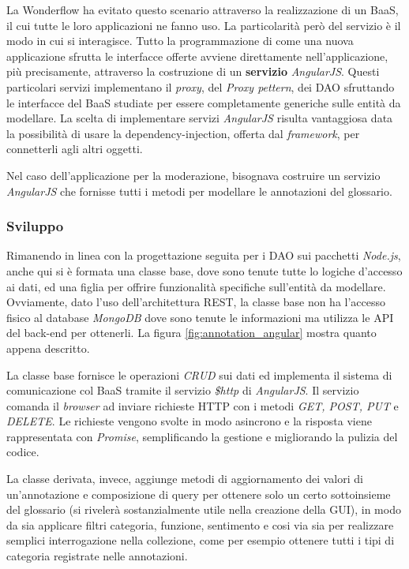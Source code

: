 La Wonderflow ha evitato questo scenario attraverso la realizzazione di un
\gls{BaaS}, il cui tutte le loro applicazioni ne fanno uso. La particolarità
però del servizio è il modo in cui si interagisce. Tutto la programmazione di
come una nuova applicazione sfrutta le interfacce offerte avviene direttamente
nell'applicazione, più precisamente, attraverso la costruzione di un
\textbf{servizio} \textit{AngularJS}. Questi particolari servizi implementano
il \textit{proxy}, del \textit{Proxy pettern}, dei \gls{DAO} sfruttando le
interfacce del \gls{BaaS} studiate per essere completamente generiche
sulle entità da modellare. La scelta di implementare servizi \textit{AngularJS}
risulta vantaggiosa data la possibilità di usare la \gls{dependency-injection},
offerta dal \textit{framework}, per connetterli agli altri oggetti.

Nel caso dell'applicazione per la moderazione, bisognava costruire un servizio
\textit{AngularJS} che fornisse tutti i metodi per modellare le annotazioni del
glossario.

\subsubsection{Sviluppo}
Rimanendo in linea con la progettazione seguita per i \gls{DAO} sui pacchetti
\textit{Node.js}, anche qui si è formata una classe base, dove sono tenute tutte
lo logiche d'accesso ai dati, ed una figlia per offrire funzionalità specifiche
sull'entità da modellare. Ovviamente, dato l'uso dell'architettura
\gls{REST}, la classe base non ha l'accesso fisico al database \textit{MongoDB}
dove sono tenute le informazioni ma utilizza le \gls{API} del \gls{back-end} per
ottenerli. La figura \ref{fig:annotation_angular} mostra quanto appena
descritto.

La classe base fornisce le operazioni \textit{CRUD} sui dati ed implementa il
sistema di comunicazione col \gls{BaaS} tramite il servizio \textit{\$http} di
\textit{AngularJS}. Il servizio comanda il \textit{browser} ad inviare richieste
HTTP con i metodi \textit{GET, POST, PUT} e \textit{DELETE}. Le richieste
vengono svolte in modo asincrono e la risposta viene rappresentata con
\textit{Promise}, semplificando la gestione e migliorando la pulizia del codice.

La classe derivata, invece, aggiunge metodi di aggiornamento dei valori di
un'annotazione e composizione di query per ottenere solo un certo sottoinsieme
del glossario (si rivelerà sostanzialmente utile nella creazione della GUI),
in modo da sia applicare filtri categoria, funzione, sentimento e cosi via sia
per realizzare semplici interrogazione nella collezione, come per esempio
ottenere tutti i tipi di categoria registrate nelle annotazioni.

